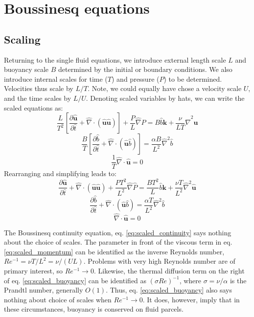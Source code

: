 \documentclass[a4paper,10pt]{article}
\begin{document}
\section{Boussinesq equations}

\subsection{Scaling}
Returning to the single fluid equations, we introduce external length scale $L$ and buoyancy scale $B$ determined by the initial or boundary conditions. 
We also introduce internal scales for time ($T$) and pressure ($P$) to be determined. 
Velocities thus scale by $L/T$. 
Note, we could equally have chose a velocity scale $U$, and the time scales by $L/U$.
Denoting scaled variables by hats, we can write the scaled equations as: 
\begin{equation}
\frac{L}{T^2}\left[\frac{\partial {\hat{\mathbf{u}}} }{\partial \hat{t}} +\hat{\nabla} \cdot \left(\hat{\mathbf{u}}\hat{\mathbf{u}}\right)\right]+\frac{P}{L}\hat{\nabla}\hat{P} = B\hat{b} {\mathbf{k}} + \frac{\nu}{L T}\hat{\nabla}^2 {\hat{\mathbf{u}}}
\end{equation}
\begin{equation}
\frac{B}{T}\left[\frac{\partial \hat{b} }{\partial \hat{t}} +\hat{\nabla} \cdot \left(\hat{\mathbf{u}}\hat{b}\right)\right] =\frac{\alpha B}{L^2} \hat{\nabla}^2 \hat{b}
\end{equation}
\begin{equation}
\frac{1}{T}\hat{\nabla} \cdot  \hat{\mathbf{u}} =0
\end{equation}
Rearranging and simplifying leads to:
\begin{equation}
\frac{\partial {\hat{\mathbf{u}}} }{\partial \hat{t}} +\hat{\nabla} \cdot \left(\hat{\mathbf{u}}\hat{\mathbf{u}}\right)
+\frac{PT^2}{L^2}\hat{\nabla}\hat{P} = \frac{BT^2}{L}\hat{b} {\mathbf{k}} + \frac{\nu T}{L^2}\hat{\nabla}^2 {\hat{\mathbf{u}}}
\label{eq:scaled_momentum}
\end{equation}
\begin{equation}
\frac{\partial \hat{b} }{\partial \hat{t}} +\hat{\nabla} \cdot \left(\hat{\mathbf{u}}\hat{b}\right) = \frac{\alpha T}{L^2} \hat{\nabla}^2 \hat{b}
\label{eq:scaled_buoyancy}
\end{equation}
\begin{equation}
\hat{\nabla} \cdot  \hat{\mathbf{u}} =0
\label{eq:scaled_continuity}
\end{equation}

The Boussinesq continuity equation, eq. \eqref{eq:scaled_continuity} says nothing about the choice of scales.
The parameter in front of the viscous term in eq. \eqref{eq:scaled_momentum} can be identified as the inverse Reynolds number, $Re^{-1}=\nu T / L^2 = \nu /(U L)$.
Problems with very high Reynolds number are of primary interest, so $Re^{-1}\rightarrow 0$. 
Likewise, the thermal diffusion term on the right of eq. \eqref{eq:scaled_buoyancy} can be identified as $(\sigma Re)^{-1}$, where $\sigma = \nu/\alpha$ is the Prandtl number, generally $O(1)$. 
Thus, eq. \eqref{eq:scaled_buoyancy} also says nothing about choice of scales when $Re^{-1} \rightarrow 0$.    
It does, however, imply that in these circumstances, buoyancy is conserved on fluid parcels.
\end{document}
